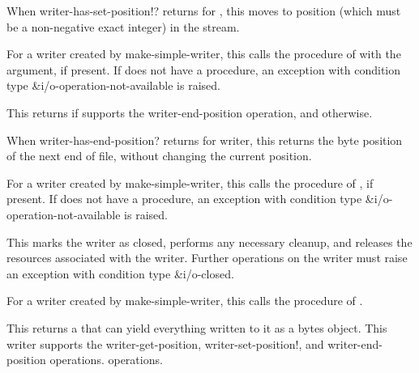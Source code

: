 \begin{entry}{%
}
   
When {\cf writer-has-set-position!?} returns \schtrue{} for
, this moves to position  (which must be a non-negative
exact integer) in the stream.
   
For a writer created by {\cf make-simple-writer}, this calls the
  procedure of  with the 
argument, if present. If  does not have a
 procedure, an exception with condition type
{\cf\&i/o-operation-not-available} is raised.
\end{entry}

\begin{entry}{%
}
   
This returns \schtrue{} if  supports the {\cf
  writer-end-position} operation, and \schfalse{} otherwise.
\end{entry}

\begin{entry}{%
}
   
When {\cf writer-has-end-position?} returns \schtrue{} for writer,
this returns the byte position of the next end of file, without
changing the current position.
   
For a writer created by {\cf make-simple-writer}, this calls the
 procedure of , if present. If 
does not have a  procedure, an exception with condition
type {\cf\&i/o-operation-not-available} is raised.
\end{entry}

\begin{entry}{%
}
   
This marks the writer as closed, performs any necessary cleanup, and
releases the resources associated with the writer. Further operations
on the writer must raise an exception with condition type
{\cf\&i/o-closed}.
   
For a writer created by {\cf make-simple-writer}, this calls the
 procedure of .
\end{entry}

\begin{entry}{%
}
   
This returns a  that can yield everything written to it as
a bytes object. This writer supports the {\cf writer-get-position},
{\cf writer-set-position!}, and {\cf writer-end-position} operations.
operations.
\end{entry}

